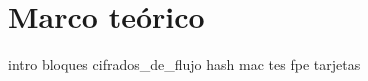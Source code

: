 %
%

\chapter{Marco teórico}

{intro}
{bloques}
{cifrados_de_flujo}
{hash}
{mac}
{tes}
{fpe}
{tarjetas}
